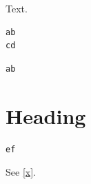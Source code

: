 \documentclass{article}
\begin{document}
Text.
\begin{lstlisting}[caption={Cap},label=x]
ab
cd
\end{lstlisting}
\begin{lstlisting}
ab
\end{lstlisting}
\section{Heading}
\begin{lstlisting}[caption={After a heading},frame=single]
ef
\end{lstlisting}
See \ref{x}.
\end{document}
